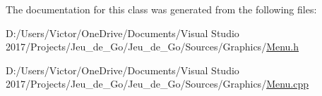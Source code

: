 The documentation for this class was generated from the following files\+:\begin{DoxyCompactItemize}
\item 
D\+:/\+Users/\+Victor/\+One\+Drive/\+Documents/\+Visual Studio 2017/\+Projects/\+Jeu\+\_\+de\+\_\+\+Go/\+Jeu\+\_\+de\+\_\+\+Go/\+Sources/\+Graphics/\hyperlink{_menu_8h}{Menu.\+h}\item 
D\+:/\+Users/\+Victor/\+One\+Drive/\+Documents/\+Visual Studio 2017/\+Projects/\+Jeu\+\_\+de\+\_\+\+Go/\+Jeu\+\_\+de\+\_\+\+Go/\+Sources/\+Graphics/\hyperlink{_menu_8cpp}{Menu.\+cpp}\end{DoxyCompactItemize}
